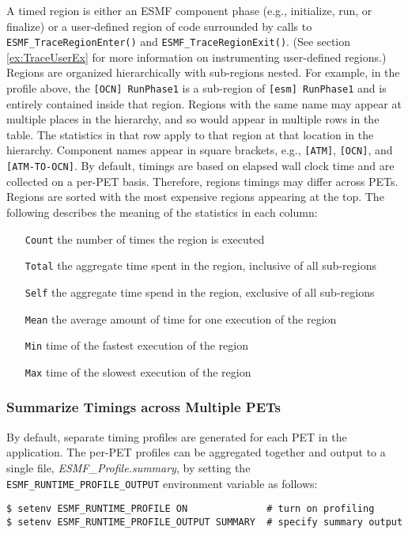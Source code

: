 A timed region is either an ESMF component phase (e.g., initialize,
run, or finalize) or a user-defined region of code surrounded by calls to
{\tt ESMF\_TraceRegionEnter()} and {\tt ESMF\_TraceRegionExit()}. (See
section \ref{ex:TraceUserEx} for more information on instrumenting
user-defined regions.)
Regions are organized hierarchically with sub-regions nested.
For example, in the profile above,
the {\tt [OCN] RunPhase1} is a sub-region of {\tt [esm] RunPhase1} and is
entirely contained inside that region. Regions with the same name may appear
at multiple places in the hierarchy, and so would appear in multiple rows
in the table.  The statistics in that row apply to that region at that
location in the hierarchy. Component names appear in square brackets,
e.g., {\tt [ATM]},  {\tt [OCN]}, and {\tt [ATM-TO-OCN]}.
By default, timings are based on elapsed wall clock time and are collected
on a per-PET basis. Therefore, regions timings may differ across PETs. Regions
are sorted with the most expensive regions appearing at the top. The following
describes the meaning of the statistics in each column:

\begin{itemize}
\item [{\tt Count}] the number of times the region is executed
\item [{\tt Total}] the aggregate time spent in the region, inclusive of all sub-regions
\item [{\tt Self}]  the aggregate time spend in the region, exclusive of all sub-regions
\item [{\tt Mean}]  the average amount of time for one execution of the region
\item [{\tt Min}]   time of the fastest execution of the region
\item [{\tt Max}]   time of the slowest execution of the region
\end{itemize}


\subsubsection{Summarize Timings across Multiple PETs}
\label{sec:SummaryProfiling}

By default, separate timing profiles are generated for each PET
in the application.  The per-PET profiles can be aggregated together
and output to a single file, {\em ESMF\_Profile.summary}, by setting the
{\tt ESMF\_RUNTIME\_PROFILE\_OUTPUT} environment variable as follows:

\begin{verbatim}
$ setenv ESMF_RUNTIME_PROFILE ON              # turn on profiling
$ setenv ESMF_RUNTIME_PROFILE_OUTPUT SUMMARY  # specify summary output
\end{verbatim}

